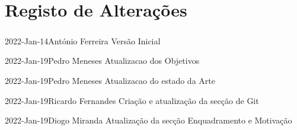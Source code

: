 \chapter*{Registo de Alterações}
\paragraph{}

\begin{logentry}{2022-Jan-14}{António Ferreira}
Versão Inicial
\end{logentry}

\begin{logentry}{2022-Jan-19}{Pedro Meneses}
Atualizacao dos Objetivos
\end{logentry}

\begin{logentry}{2022-Jan-19}{Pedro Meneses}
Atualizacao do estado da Arte
\end{logentry}

\begin{logentry}{2022-Jan-19}{Ricardo Fernandes}
Criação e atualização da secção de Git
\end{logentry}

\begin{logentry}{2022-Jan-19}{Diogo Miranda}
Atualização da secção Enquadramento e Motivação
\end{logentry}